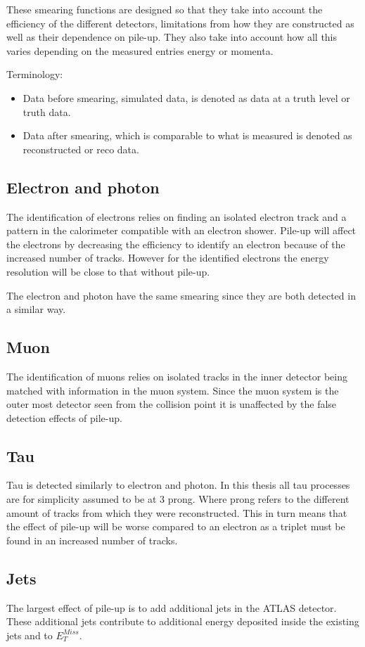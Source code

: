 These smearing functions are designed so that they take into account the efficiency of the different detectors, limitations from how they are constructed as well as their dependence on pile-up. They also take into account how all this varies depending on the measured entries energy or momenta.

Terminology:
\begin{itemize}
\item Data before smearing, simulated data, is denoted as data at a truth level or truth data.
\item Data after smearing, which is comparable to what is measured is denoted as reconstructed or reco data.
\end{itemize}

\subsection{Electron and photon}
The identification of electrons relies on finding an isolated electron track and a pattern in the calorimeter compatible with an electron shower. Pile-up will affect the electrons by decreasing the efficiency to identify an electron because of the increased number of tracks. However for the identified electrons the energy resolution will be close to that without pile-up.

The electron and photon have the same smearing since they are both detected in a similar way. 

\subsection{Muon}
The identification of muons relies on isolated tracks in the inner detector  being matched with information in the muon system. Since the muon system is the outer most detector seen from the collision point it is unaffected by the false detection effects of pile-up.  
\subsection{Tau}\label{sec:smear:subsec:tau}
Tau is detected similarly to electron and photon.
In this thesis all tau processes are for simplicity assumed to be at 3 prong. Where prong refers to the different amount of tracks from which they were reconstructed. This in turn means that the effect of pile-up will be worse compared to an electron as a triplet must be found in an increased number of tracks.
\subsection{Jets}
The largest effect of pile-up is to add additional jets in the ATLAS detector. These additional jets contribute to additional energy deposited inside the existing jets and to $E^{Miss}_T$.

